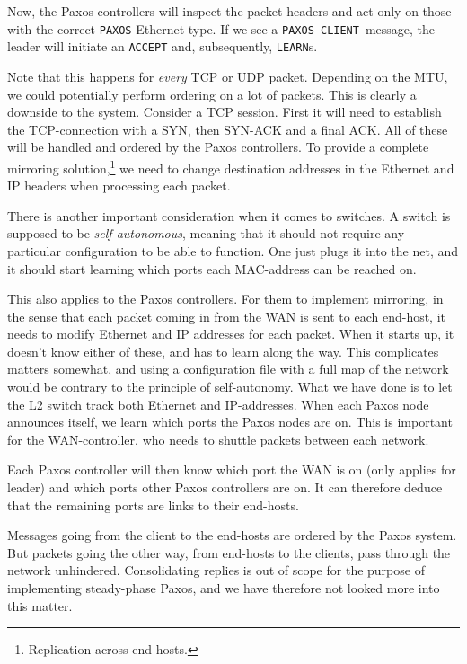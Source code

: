 Now, the Paxos-controllers will inspect the packet headers and act only on
those with the correct \texttt{PAXOS} Ethernet type.  If we see a
\texttt{PAXOS CLIENT} message, the leader will initiate an \texttt{ACCEPT}
and, subsequently, \texttt{LEARN}s.

Note that this happens for \textit{every} \ac{TCP} or \ac{UDP} packet.
Depending on the \ac{MTU}, we could potentially perform ordering on a lot of
packets.  This is clearly a downside to the system.  Consider a \acs{TCP}
session. First it will need to establish the \acs{TCP}-connection with a
SYN, then SYN-ACK and a final ACK.
All of these will be handled and ordered by the Paxos controllers.
To provide a complete mirroring solution,\footnote{Replication across
end-hosts.} we need to change destination addresses in the Ethernet and
\ac{IP} headers when processing each packet.

There is another important consideration when it comes to switches.
A switch is supposed to be \textit{self-autonomous}, meaning that it should
not require any particular configuration to be able to function. One just
plugs it into the net, and it should start learning which ports each
MAC-address can be reached on.  

This also applies to the Paxos controllers. For them to implement mirroring,
in the sense that each packet coming in from the \ac{WAN} is sent to
each end-host, it needs to modify Ethernet and IP addresses for each packet.
When it starts up, it doesn't know either of these, and has to learn along
the way.  This complicates matters somewhat, and using a configuration file
with a full map of the network would be contrary to the principle of
self-autonomy.  What we have done is to let the L2 switch track both
Ethernet and IP-addresses. When each Paxos node announces itself, we learn
which ports the Paxos nodes are on. This is important for the
WAN-controller, who needs to shuttle packets between each network.

Each Paxos controller will then know which port the WAN is on (only applies
for leader) and which ports other Paxos controllers are on. It can therefore
deduce that the remaining ports are links to their end-hosts.

Messages going from the client to the end-hosts are ordered by the Paxos
system. But packets going the other way, from end-hosts to the clients, pass
through the network unhindered.  Consolidating replies is out of scope for
the purpose of implementing steady-phase Paxos, and we have therefore not
looked more into this matter.

